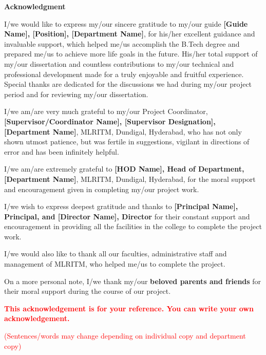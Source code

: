 \documentclass[12pt,a4paper]{report}
\newcommand{\deptName}{[Department Name]}                %
\newcommand{\guide}{[Guide Name]}                       %
\newcommand{\guideDesignation}{[Position]}              %
\newcommand{\supervisor}{[Supervisor/Coordinator Name]}  %
\newcommand{\supervisorDesignation}{[Supervisor Designation]}  %
\newcommand{\hod}{[HOD Name]}                           %
\newcommand{\principal}{[Principal Name]}               %
\newcommand{\director}{[Director Name]}                 %
\newenvironment{acknowledgment}{
    \clearpage
    \phantomsection
    \addcontentsline{toc}{chapter}{Acknowledgment}  %
    \vspace*{-1cm}
    \begin{center}
        \Huge\bfseries Acknowledgment
    \end{center}
    \vspace{0.5cm}
    \begin{spacing}{1.5}
    \noindent
    \noindent
}{
    \end{spacing}
    \vspace{1cm}
    \clearpage
}
\begin{document}
\pagestyle{fancy} %

\begin{acknowledgment}
    I/we would like to express my/our sincere gratitude to my/our guide
    \textbf{\guide, \guideDesignation, \deptName}, for his/her excellent guidance and invaluable support, which helped me/us accomplish the B.Tech degree and prepared me/us to achieve more life goals in the future. His/her total support of my/our dissertation and countless contributions to my/our technical and professional development made for a truly enjoyable and fruitful experience. Special thanks are dedicated for the discussions we had during my/our project period and for reviewing my/our dissertation.

    I/we am/are very much grateful to my/our Project Coordinator,
    \textbf{\supervisor, \supervisorDesignation, \deptName}, MLRITM, Dundigal, Hyderabad, who has not only shown utmost patience, but was fertile in suggestions, vigilant in directions of error and has been infinitely helpful.

    I/we am/are extremely grateful to
    \textbf{\hod, Head of Department, \deptName}, MLRITM, Dundigal, Hyderabad, for the moral support and encouragement given in completing my/our project work.

    I/we wish to express deepest gratitude and thanks to
    \textbf{\principal, Principal, and \director, Director} for their constant support and encouragement in providing all the facilities in the college to complete the project work.

    I/we would also like to thank all our faculties, administrative staff and management of MLRITM, who helped me/us to complete the project.

    On a more personal note, I/we thank my/our \textbf{beloved parents and friends} for their moral support during the course of our project.

    \vspace{20pt}

    \textcolor{red}{\textbf{This acknowledgement is for your reference. You can write your own acknowledgement.}}

    \textcolor{red}{(Sentences/words may change depending on individual copy and department copy)}
\end{acknowledgment}
\end{document}
